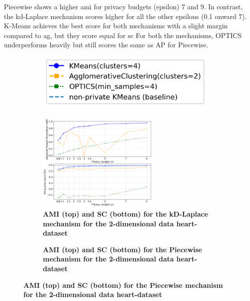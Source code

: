 Piecewise shows a higher \gls{ami} for privacy budgets (epsilon) 7 and 9. In contrast, the kd-Laplace mechanism scores higher for all the other epsilons (0.1 onward 7).
K-Means achieves the best score for both mechanisms with a slight margin compared to \gls{ag}, but they score equal for \gls{sc}
For both the mechanisms, OPTICS underperforms heavily but still scores the same as AP for Piecewise.
\newpage
\begin{figure}[H]
      \centering
      \begin{subfigure}{0.3\textwidth}
            \includegraphics[width=\textwidth]{Results/kd-laplace/kd-Laplace/heart-dataset/legend_2.png}
      \end{subfigure}
      \begin{subfigure}{1\textwidth}
            \caption{\textbf{AMI (top) and SC (bottom) for the kD-Laplace mechanism for the 2-dimensional data heart-dataset}}
            \centering
            \includegraphics[width=0.65\textwidth]{Results/kd-laplace/kd-Laplace/heart-dataset/ami-and-sc_2_dimensions.png}
            \centering
      \end{subfigure}
      \begin{subfigure}{1\textwidth}
            \caption{\textbf{AMI (top) and SC (bottom) for the Piecewise mechanism for the 2-dimensional data heart-dataset}}

\end{subfigure}
\end{figure}
